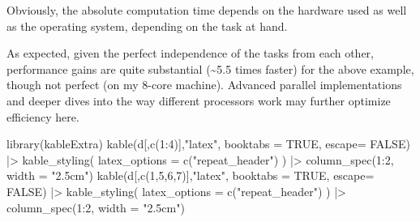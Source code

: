 \documentclass[
  12pt,
  letterpaper,
]{krantz}
\newenvironment{Shaded}{\begin{snugshade}}{\end{snugshade}}
\newcommand{\AttributeTok}[1]{\textcolor[rgb]{0.40,0.45,0.13}{#1}}
\newcommand{\ConstantTok}[1]{\textcolor[rgb]{0.56,0.35,0.01}{#1}}
\newcommand{\DecValTok}[1]{\textcolor[rgb]{0.68,0.00,0.00}{#1}}
\newcommand{\FunctionTok}[1]{\textcolor[rgb]{0.28,0.35,0.67}{#1}}
\newcommand{\NormalTok}[1]{\textcolor[rgb]{0.00,0.23,0.31}{#1}}
\newcommand{\SpecialCharTok}[1]{\textcolor[rgb]{0.37,0.37,0.37}{#1}}
\newcommand{\StringTok}[1]{\textcolor[rgb]{0.13,0.47,0.30}{#1}}
\begin{document}
Obviously, the absolute computation time depends on the hardware used as
well as the operating system, depending on the task at hand.

As expected, given the perfect independence of the tasks from each
other, performance gains are quite substantial (\textasciitilde5.5 times
faster) for the above example, though not perfect (on my 8-core
machine). Advanced parallel implementations and deeper dives into the
way different processors work may further optimize efficiency here.

\begin{Shaded}
\begin{Highlighting}[]
\FunctionTok{library}\NormalTok{(kableExtra)}
\FunctionTok{kable}\NormalTok{(d[,}\FunctionTok{c}\NormalTok{(}\DecValTok{1}\SpecialCharTok{:}\DecValTok{4}\NormalTok{)],}\StringTok{"latex"}\NormalTok{,}
      \AttributeTok{booktabs =} \ConstantTok{TRUE}\NormalTok{,}
      \AttributeTok{escape=} \ConstantTok{FALSE}\NormalTok{) }\SpecialCharTok{|\textgreater{}}
      \FunctionTok{kable\_styling}\NormalTok{(}
        \AttributeTok{latex\_options =} \FunctionTok{c}\NormalTok{(}\StringTok{"repeat\_header"}\NormalTok{)}
\NormalTok{        ) }\SpecialCharTok{|\textgreater{}}
      \FunctionTok{column\_spec}\NormalTok{(}\DecValTok{1}\SpecialCharTok{:}\DecValTok{2}\NormalTok{, }\AttributeTok{width =} \StringTok{"2.5cm"}\NormalTok{)}
\FunctionTok{kable}\NormalTok{(d[,}\FunctionTok{c}\NormalTok{(}\DecValTok{1}\NormalTok{,}\DecValTok{5}\NormalTok{,}\DecValTok{6}\NormalTok{,}\DecValTok{7}\NormalTok{)],}\StringTok{"latex"}\NormalTok{,}
      \AttributeTok{booktabs =} \ConstantTok{TRUE}\NormalTok{,}
      \AttributeTok{escape=} \ConstantTok{FALSE}\NormalTok{) }\SpecialCharTok{|\textgreater{}}
      \FunctionTok{kable\_styling}\NormalTok{(}
        \AttributeTok{latex\_options =} \FunctionTok{c}\NormalTok{(}\StringTok{"repeat\_header"}\NormalTok{)}
\NormalTok{        ) }\SpecialCharTok{|\textgreater{}}
      \FunctionTok{column\_spec}\NormalTok{(}\DecValTok{1}\SpecialCharTok{:}\DecValTok{2}\NormalTok{, }\AttributeTok{width =} \StringTok{"2.5cm"}\NormalTok{)}
\end{Highlighting}
\end{Shaded}
\end{document}
